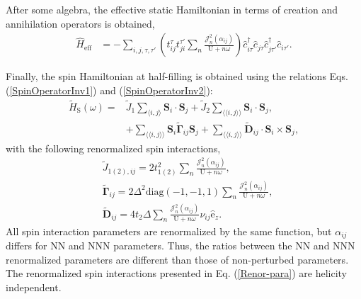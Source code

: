 \documentclass[aps,prl,twocolumn,amsmath,amssymb,nobibnotes]{revtex4-1}%
\newcommand{\n}{\nonumber}
\newcommand{\bs}{\boldsymbol}
\begin{document}
After some algebra, the effective static Hamiltonian in terms of creation and annihilation operators is obtained,
\begin{align}
\hat{H}_{\text{eff}} &= - \sum_{i,j, \tau, \tau'} \left(t_{ij}^{\tau} t_{ji}^{\tau'} \sum_{n} \frac{\mathcal{J}_{n}^2(\alpha_{ij})}{\text{U}+n\omega} \right)  \hat{c}_{i \tau}^\dagger \hat{c}_{j \tau} \hat{c}_{j \tau'}^\dagger \hat{c}_{i \tau'}. \label{GeneralHeff}
\end{align}



Finally, the spin Hamiltonian at half-filling is obtained using the relations Eqs. (\ref{SpinOperatorInv1}) and (\ref{SpinOperatorInv2}):
\begin{align}
\label{MKMHeffw}
\tilde{H}_{\text{S}}(\omega) =& \tilde{J}_{1}\sum_{\langle i,j \rangle} \bs{S}_i\cdot\bs{S}_j + \tilde{J}_{2}\sum_{\langle \langle i,j \rangle \rangle} \bs{S}_i\cdot\bs{S}_j, \n \\
&+ \sum_{\langle \langle i,j \rangle \rangle} \bs{S}_i \tilde{\bs{\Gamma}}_{ij} \bs{S}_j +\sum_{\langle \langle i,j \rangle \rangle} \tilde{\bs{D}}_{ij}\cdot \bs{S}_i \times \bs{S}_j,
\end{align}
with the following renormalized spin interactions,
\begin{subequations}
\label{Renor-para}
\begin{align}
&\tilde{J}_{1(2),ij} = 2t_{1(2)}^2\sum_n\frac{\mathcal{J}_{n}^2(\alpha_{ij})}{\text{U}+n\omega}, \\
&\tilde{\bs{\Gamma}}_{ij} = 2\Delta^2 \text{diag}(-1,-1,1) \sum_n\frac{\mathcal{J}_{n}^2(\alpha_{ij})}{\text{U}+n\omega},\\
&\tilde{\bs{D}}_{ij} = 4 t_2 \Delta \sum_n\frac{\mathcal{J}_{n}^2(\alpha_{ij})}{\text{U}+n\omega} \nu_{ij} \hat{\mathrm{e}}_z.
\end{align}
\end{subequations}
All spin interaction parameters are renormalized by the same function, but $\alpha_{ij}$ differs for NN and NNN parameters. Thus, the ratios between the NN and NNN renormalized parameters are different than those of non-perturbed parameters. The renormalized spin interactions presented in Eq. (\ref{Renor-para}) are helicity independent.
\end{document}
